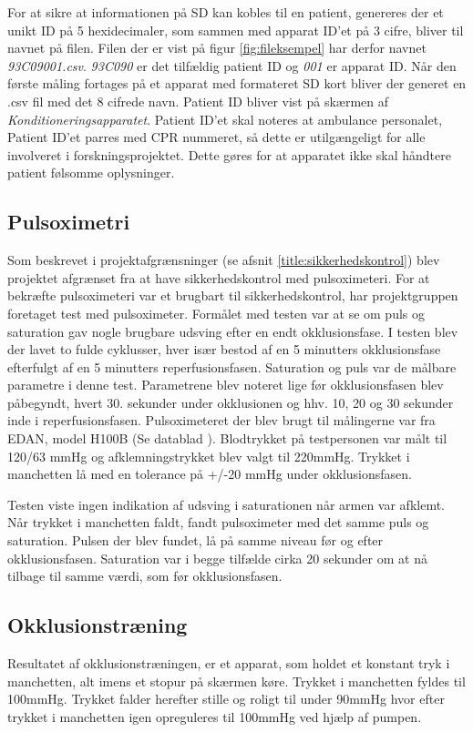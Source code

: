 For at sikre at informationen på SD kan kobles til en patient, genereres der et unikt ID på 5 hexidecimaler, som sammen med apparat ID'et på 3 cifre, bliver til navnet på filen. Filen der er vist på figur \ref{fig:fileksempel} har derfor navnet \textit{93C09001.csv}. \textit{93C090} er det tilfældig patient ID og \textit{001} er apparat ID. Når den første måling fortages på et apparat med formateret SD kort bliver der generet en .csv fil med det 8 cifrede navn. Patient ID bliver vist på skærmen af \textit{Konditioneringsapparatet}. Patient ID'et skal noteres at ambulance personalet, Patient ID'et parres med CPR nummeret, så dette er utilgængeligt for alle involveret i forskningsprojektet. Dette gøres for at apparatet ikke skal håndtere patient følsomme oplysninger.

\subsection{Pulsoximetri} \label{title:pulsOxi}
Som beskrevet i projektafgrænsninger (se afsnit \ref{title:sikkerhedskontrol}) blev projektet afgrænset fra at have sikkerhedskontrol med pulsoximeteri. For at bekræfte pulsoximeteri var et brugbart til sikkerhedskontrol, har projektgruppen foretaget test med pulsoximeter. Formålet med testen var at se om puls og saturation gav nogle brugbare udsving efter en endt okklusionsfase. I testen blev der lavet to fulde cyklusser, hver især bestod af en 5 minutters okklusionsfase efterfulgt af en 5 minutters reperfusionsfasen. Saturation og puls var de målbare parametre i denne test. Parametrene blev noteret lige før okklusionsfasen blev påbegyndt, hvert 30. sekunder under okklusionen og hhv. 10, 20 og 30 sekunder inde i reperfusionsfasen. Pulsoximeteret der blev brugt til målingerne var fra EDAN, model H100B (Se datablad \cite{RefWorks:30}). Blodtrykket på testpersonen var målt til 120/63 mmHg og afklemningstrykket blev valgt til 220mmHg. Trykket i manchetten lå med en tolerance på +/-20 mmHg under okklusionsfasen. 

Testen viste ingen indikation af udsving i saturationen når armen var afklemt. Når trykket i manchetten faldt, fandt pulsoximeter med det samme puls og saturation. Pulsen der blev fundet, lå på samme niveau før og efter okklusionsfasen. Saturation var i begge tilfælde cirka 20 sekunder om at nå tilbage til samme værdi, som før okklusionsfasen. 

\subsection{Okklusionstræning}
Resultatet af okklusionstræningen, er et apparat, som holdet et konstant tryk i manchetten, alt imens et stopur på skærmen køre. Trykket i manchetten fyldes til 100mmHg. Trykket falder herefter stille og roligt til under 90mmHg hvor efter trykket i manchetten igen opreguleres til 100mmHg ved hjælp af pumpen. 

